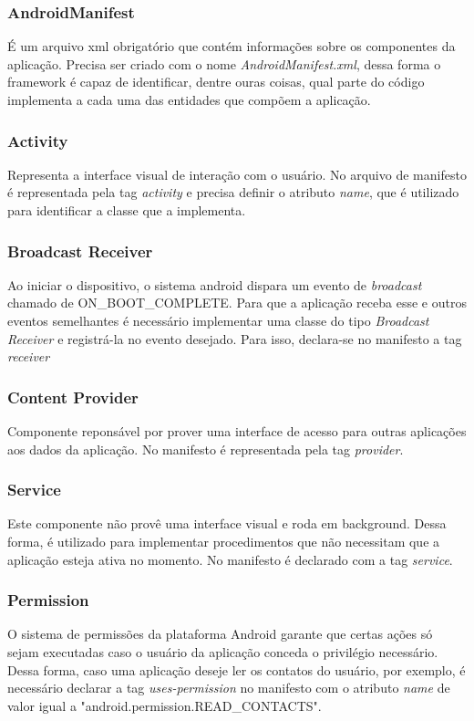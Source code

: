 \documentclass[a4paper,12pt]{article}
\numberwithin{figure}{section}
\begin{document}
\subsubsection{AndroidManifest}
É um arquivo xml obrigatório que contém informações sobre os componentes da aplicação. Precisa ser criado com o nome \textit{AndroidManifest.xml}, dessa forma o framework é capaz de identificar, dentre ouras coisas, qual parte do código implementa a cada uma das entidades que compõem a aplicação.

\subsubsection{Activity}
Representa a interface visual de interação com o usuário. No arquivo de manifesto é representada pela tag \textit{activity} e precisa definir o atributo \textit{name}, que é utilizado para identificar a classe que a implementa.

\subsubsection{Broadcast Receiver}
Ao iniciar o dispositivo, o sistema android dispara um evento de \textit{broadcast} chamado de ON\_BOOT\_COMPLETE. Para que a aplicação receba esse e outros eventos semelhantes é necessário implementar uma classe do tipo \textit{Broadcast Receiver} e registrá-la no evento desejado. Para isso, declara-se no manifesto a tag \textit{receiver} 

\subsubsection{Content Provider}
Componente reponsável por prover uma interface de acesso para outras aplicações aos dados da aplicação. No manifesto é representada pela tag \textit{provider}.

\subsubsection{Service}

Este componente não provê uma interface visual e roda em background. Dessa forma, é utilizado para implementar procedimentos  que não necessitam que a aplicação esteja ativa no momento. No manifesto é declarado com a tag \textit{service}.

\subsubsection{Permission}
O sistema de permissões da plataforma Android garante que certas ações só sejam executadas caso o usuário da aplicação conceda o privilégio necessário. Dessa forma, caso uma aplicação deseje ler os contatos do usuário, por exemplo, é necessário declarar a tag \textit{uses-permission} no manifesto com o atributo \textit{name} de valor igual a "android.permission.READ\_CONTACTS".
\end{document}
